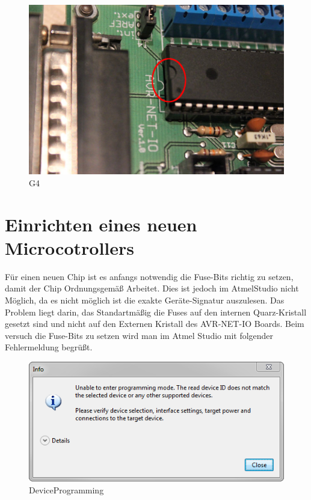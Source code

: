 \begin{figure}[H]
\centering
\includegraphics[width=13cm]{content/pictures/Anleitung/tauscheProzessor/4_Markierung.jpg}
\caption{G4}
\label{ausbau4}
\end{figure}

\section{Einrichten eines neuen Microcotrollers}

Für einen neuen Chip ist es anfangs notwendig die Fuse-Bits richtig zu setzen,
damit der Chip Ordnungsgemäß Arbeitet.
Dies ist jedoch im AtmelStudio nicht Möglich, da es nicht möglich ist die exakte
Geräte-Signatur auszulesen.
Das Problem liegt darin, das Standartmäßig die Fuses auf den internen
Quarz-Kristall gesetzt sind und nicht auf den Externen Kristall des
AVR-NET-IO Boards.
Beim versuch die Fuse-Bits zu setzen wird man im Atmel Studio mit folgender
Fehlermeldung begrüßt. 
\begin{figure}[h]
\centering
\includegraphics[width=13cm]{content/pictures/Anleitung/neuerProzessor/AnleitungNeuerProzessor2_fehler.png}
\caption{DeviceProgramming}
\end{figure}

